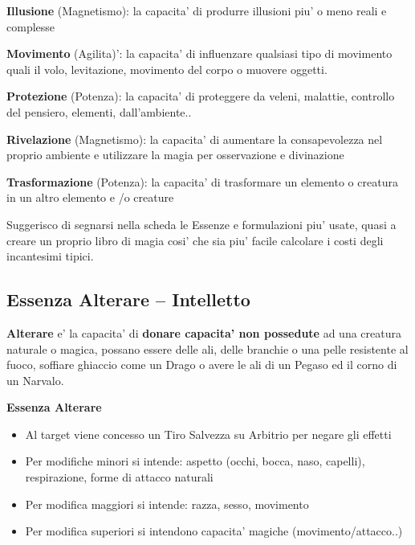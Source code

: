 \documentclass[a4paper,11pt,twoside,openany]{dndbook}
\begin{document}
\textbf{Illusione} (Magnetismo): la capacita' di produrre illusioni piu' o meno reali e complesse

\textbf{Movimento} (Agilita)': la capacita' di influenzare qualsiasi tipo di movimento quali il volo, levitazione, movimento del corpo o muovere oggetti.

\textbf{Protezione} (Potenza): la capacita' di proteggere da veleni, malattie, controllo del pensiero, elementi, dall'ambiente..

\textbf{Rivelazione} (Magnetismo): la capacita' di aumentare la consapevolezza nel proprio ambiente e utilizzare la magia per osservazione e divinazione

\textbf{Trasformazione} (Potenza): la capacita' di trasformare un elemento o creatura in un altro elemento e /o creature

\bigskip

Suggerisco di segnarsi nella scheda le Essenze e formulazioni piu' usate, quasi a creare un proprio libro di magia cosi' che sia piu' facile calcolare i costi degli incantesimi tipici.

\pagebreak

\subsection{Essenza Alterare -- Intelletto}

\label{essenza-alterare---intelletto}

\textbf{Alterare} e' la capacita' di \textbf{donare capacita' non possedute} ad una creatura naturale o magica, possano essere delle ali, delle branchie o una pelle resistente al fuoco, soffiare ghiaccio come un Drago o avere le ali di un Pegaso ed il corno di un Narvalo.

\bigskip

\textbf{Essenza Alterare}
\begin{itemize}
\item 
Al target viene concesso un Tiro Salvezza su Arbitrio per negare gli effetti 
\item 
Per modifiche minori si intende: aspetto (occhi, bocca, naso, capelli), respirazione, forme di attacco naturali 
\item 
Per modifica maggiori si intende: razza, sesso, movimento 
\item 
Per modifica superiori si intendono capacita' magiche (movimento/attacco..) 
\end{itemize}
\end{document}
